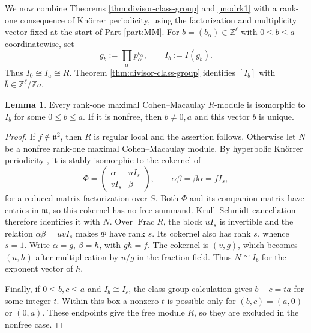 \documentclass[a4paper,reqno]{amsart}
\def\m{\mathfrak{m}}
\def\n{\mathfrak{n}}
\DeclareMathOperator{\Frac}{Frac}
\theoremstyle{definition}
\newtheorem{Lem}[Thm]{Lemma}
\begin{document}
We now combine Theorems \ref{thm:divisor-class-group} and \ref{modrk1} with a rank-one consequence of Kn\"orrer periodicity, using the factorization and multiplicity vector fixed at the start of Part \ref{part:MM}. For $b=(b_\alpha)\in\mathbb Z^\ell$ with $0\le b\le a$ coordinatewise, set
\[
g_b:=\prod_\alpha p_\alpha^{b_\alpha},\qquad I_b:=I(g_b).
\]
Thus $I_0\cong I_a\cong R$. Theorem \ref{thm:divisor-class-group} identifies $[I_b]$ with $\overline b\in\mathbb Z^\ell/\mathbb Za$.

\begin{Lem}\label{lem:rank-one-mcm-classification}
Every rank-one maximal Cohen--Macaulay $R$-module is isomorphic to $I_b$ for some $0\le b\le a$. If it is nonfree, then $b\ne0,a$ and this vector $b$ is unique.
\end{Lem}
\begin{proof}
If $f\notin\n^2$, then $R$ is regular local and the assertion follows. Otherwise let $N$ be a nonfree rank-one maximal Cohen--Macaulay module. By hyperbolic Kn\"orrer periodicity \cite[Theorem 2.4]{Leu26}, it is stably isomorphic to the cokernel of
\[
\Phi=\begin{pmatrix}\alpha&uI_s\\vI_s&\beta\end{pmatrix},
\qquad \alpha\beta=\beta\alpha=fI_s,
\]
for a reduced matrix factorization over $S$. Both $\Phi$ and its companion matrix have entries in $\m$, so this cokernel has no free summand. Krull--Schmidt cancellation therefore identifies it with $N$. Over $\Frac R$, the block $uI_s$ is invertible and the relation $\alpha\beta=uvI_s$ makes $\Phi$ have rank $s$. Its cokernel also has rank $s$, whence $s=1$. Write $\alpha=g$, $\beta=h$, with $gh=f$. The cokernel is $(v,g)$, which becomes $(u,h)$ after multiplication by $u/g$ in the fraction field. Thus $N\cong I_b$ for the exponent vector of $h$.

Finally, if $0\le b,c\le a$ and $I_b\cong I_c$, the class-group calculation gives $b-c=ta$ for some integer $t$. Within this box a nonzero $t$ is possible only for $(b,c)=(a,0)$ or $(0,a)$. These endpoints give the free module $R$, so they are excluded in the nonfree case.
\end{proof}
\end{document}
